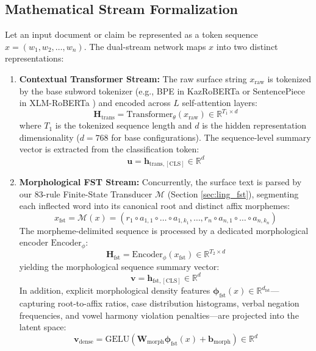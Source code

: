 \subsection{Mathematical Stream Formalization}
Let an input document or claim be represented as a token sequence $x = (w_1, w_2, \dots, w_n)$. The dual-stream network maps $x$ into two distinct representations:
\begin{enumerate}
    \item \textbf{Contextual Transformer Stream:} The raw surface string $x_{\text{raw}}$ is tokenized by the base subword tokenizer (e.g., BPE in KazRoBERTa \citep{sagyndyk2025kazroberta} or SentencePiece in XLM-RoBERTa \citep{conneau2020xlmr}) and encoded across $L$ self-attention layers:
    \begin{equation}
        \label{eq:trans_stream}
        \mathbf{H}_{\text{trans}} = \mathrm{Transformer}_\theta(x_{\text{raw}}) \in \mathbb{R}^{T_1 \times d}
    \end{equation}
    where $T_1$ is the tokenized sequence length and $d$ is the hidden representation dimensionality ($d = 768$ for base configurations). The sequence-level summary vector is extracted from the classification token:
    \begin{equation}
        \mathbf{u} = \mathbf{h}_{\text{trans}, [\text{CLS}]} \in \mathbb{R}^d
    \end{equation}
    
    \item \textbf{Morphological FST Stream:} Concurrently, the surface text is parsed by our 83-rule Finite-State Transducer $\mathcal{M}$ (Section \ref{sec:ling_fst}), segmenting each inflected word into its canonical root and distinct affix morphemes:
    \begin{equation}
        x_{\text{fst}} = \mathcal{M}(x) = (r_1 \circ a_{1,1} \circ \dots \circ a_{1,k_1}, \dots, r_n \circ a_{n,1} \circ \dots \circ a_{n,k_n})
    \end{equation}
    The morpheme-delimited sequence is processed by a dedicated morphological encoder $\mathrm{Encoder}_\phi$:
    \begin{equation}
        \label{eq:fst_stream}
        \mathbf{H}_{\text{fst}} = \mathrm{Encoder}_\phi(x_{\text{fst}}) \in \mathbb{R}^{T_2 \times d}
    \end{equation}
    yielding the morphological sequence summary vector:
    \begin{equation}
        \mathbf{v} = \mathbf{h}_{\text{fst}, [\text{CLS}]} \in \mathbb{R}^d
    \end{equation}
    In addition, explicit morphological density features $\bm{\phi}_{\text{fst}}(x) \in \mathbb{R}^{d_{\text{fst}}}$---capturing root-to-affix ratios, case distribution histograms, verbal negation frequencies, and vowel harmony violation penalties---are projected into the latent space:
    \begin{equation}
        \mathbf{v}_{\text{dense}} = \mathrm{GELU}(\mathbf{W}_{\text{morph}} \bm{\phi}_{\text{fst}}(x) + \mathbf{b}_{\text{morph}}) \in \mathbb{R}^d
    \end{equation}
\end{enumerate}

